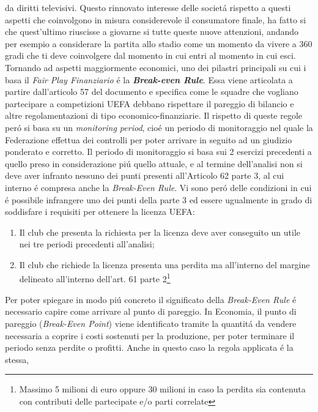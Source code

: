 \documentclass[
    corpo=12pt,
    oneside,
    evenboxes,
    tipotesi=triennale,
    stile=classica,
    oldstyle,
    autoretitolo,
    greek,
]{toptesi}
\begin{document}
\begin{interlinea}{1.5}
da diritti televisivi.\newline
Questo rinnovato interesse delle societ\'a rispetto a questi aspetti che coinvolgono in misura considerevole il consumatore finale, ha fatto
si che quest'ultimo riuscisse a giovarne si tutte queste nuove attenzioni, andando per esempio a considerare la partita allo stadio come
un momento da vivere a 360 gradi che ti deve coinvolgere dal momento in cui entri al momento in cui esci.\newline
Tornando ad aspetti maggiormente economici, uno dei pilastri principali su cui i basa il \emph{Fair Play Finanziario} \'e la \emph{\textbf{Break-even Rule}}.
Essa viene articolata a partire dall'articolo 57 del documento e specifica come le squadre che vogliano partecipare a competizioni UEFA debbano
rispettare il pareggio di bilancio e altre regolamentazioni di tipo economico-finanziarie. Il rispetto di queste regole per\'o si basa su 
un \emph{monitoring period}, cio\'e un periodo di monitoraggio nel quale la Federazione effettua dei controlli per poter arrivare in seguito 
ad un giudizio ponderato e corretto. Il periodo di monitoraggio si basa sui 2 esercizi precedenti a quello preso in considerazione pi\'u quello attuale,
e al termine dell'analisi non si deve aver infranto nessuno dei punti presenti all'Articolo 62 parte 3, al cui interno 
\'e compresa anche la \emph{Break-Even Rule}. Vi sono per\'o delle condizioni in cui \'e possibile infrangere uno dei punti della parte 3 
ed essere ugualmente in grado di soddisfare i requisiti per ottenere la licenza UEFA:
\begin{enumerate}
    \item Il club che presenta la richiesta per la licenza deve aver conseguito un utile nei tre periodi precedenti all'analisi;
    \item Il club che richiede la licenza presenta una perdita ma all'interno del margine delineato all'interno dell'art. 61 parte 2\footnote{Massimo 5 milioni di euro oppure 30 milioni in caso la perdita sia contenuta con contributi delle partecipate e/o parti correlate}
\end{enumerate}
Per poter spiegare in modo pi\'u concreto il significato della \emph{Break-Even Rule} \'e necessario capire come arrivare al punto di pareggio.
In Economia, il punto di pareggio (\emph{Break-Even Point}) viene identificato tramite la quantit\'a da vendere necessaria a coprire i costi 
sostenuti per la produzione, per poter terminare il periodo senza perdite o profitti. Anche in questo caso la regola applicata \'e la stessa,

\end{interlinea}
\end{document}
